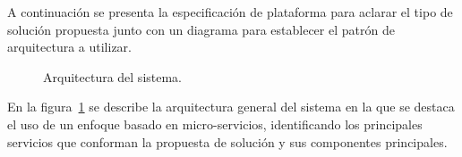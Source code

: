 A continuación se presenta la especificación de plataforma para aclarar el tipo de solución propuesta junto con un diagrama para establecer el patrón de arquitectura a utilizar.


\begin{figure}[htbp!]
	\begin{center}
		\caption{Arquitectura del sistema.}
		\label{fig:arquitectura}
	\end{center}
\end{figure}

En la figura~\ref{fig:arquitectura} se describe la arquitectura general del sistema en la que se destaca el uso de un enfoque basado en micro-servicios, identificando los principales servicios que conforman la propuesta de solución y sus componentes principales.
